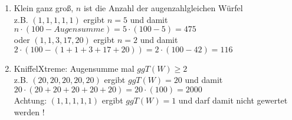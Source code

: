\documentclass[a4paper,11pt]{exam}
\begin{document}
\begin{enumerate}
\item Klein ganz groß, $n$ ist die Anzahl der augenzahlgleichen Würfel\\
       z.B. $(1,1,1,1,1)$ ergibt $n=5$ und damit 
       $n\cdot (100 - Augensumme)=5\cdot(100-5)=475$\\
       oder $(1,1,3,17,20)$ ergibt $n=2$ und damit $2\cdot(100-(1+1+3+17+20))=
       2\cdot(100-42)=116$
\item KniffelXtreme: Augensumme mal $ggT(W)\geq 2$\\
       z.B. $(20,20,20,20,20)$ ergibt $ggT(W)=20$ und damit 
       $20\cdot (20+20+20+20+20)=20\cdot(100)=2000$\\
       Achtung: $(1,1,1,1,1)$ ergibt $ggT(W)=1$ und darf damit nicht gewertet werden ! 
\end{enumerate}
\end{document}
